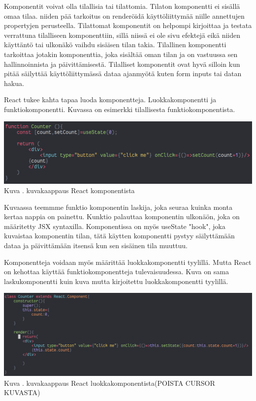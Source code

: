 
Komponentit voivat olla tilallisia tai tilattomia. 
%
Tilaton komponentti ei sisällä omaa tilaa. 
niiden pää tarkoitus on renderöidä käyttöliittymää niille annettujen propertyjen perusteella.
Tilattomat komponentit on helpompi kirjoittaa ja testata verrattuna tilalliseen komponenttiin, 
sillä niissä ei ole sivu efektejä eikä niiden käyttäntö tai ulkonäkö vaihdu sisäisen tilan takia.
%
Tilallinen komponentti tarkoittaa jotakin komponenttia, joka sisältää oman tilan ja on vastuussa sen hallinnoinnista ja päivittämisestä.
Tilalliset komponentit ovat hyvä silloin kun pitää säilyttää käyttöliittymässä dataa ajanmyötä kuten form inputs tai datan hakua.
\medskip


React tukee kahta tapaa luoda komponentteja. Luokkakomponentti ja funktiokomponentti.\citemissing
Kuvassa \nextImageCount {} on esimerkki tilallisesta funktiokomponentista.
\bigskip


\includegraphics[width=15cm]{src/public/oppar/function_component.png}\\
Kuva \getImgCount{}. kuvakaappaus React komponentista
\medskip

Kuvaassa teemmme funktio komponentin laskija, joka seuraa kuinka monta kertaa nappia on painettu.
Kunktio palauttaa komponentin ulkonäön, joka on määritetty JSX syntaxilla.
Komponentissa on myös useState "hook"{}, joka kuvaistaa komponentin tilan, tätä käytten komponentti pystyy säilyttämään dataa ja päivittämään itsensä kun sen sisäinen tila muuttuu.
\medskip

Komponentteja voidaan myös määrittää luokkakomponentti tyylillä. Mutta React on kehottaa käyttää funktiokomponentteja tulevaisuudessa. 
Kuva \nextImageCount {} on sama laskukomponentti kuin kuva \theimgCounter{} mutta kirjoitettu luokkakomponentti tyylillä. 
\medskip
\bigskip


\includegraphics[width=15cm]{src/public/oppar/class_.png}\\
Kuva \getImgCount{}. kuvakaappaus React luokkakomponentista(POISTA CURSOR KUVASTA)
\medskip

